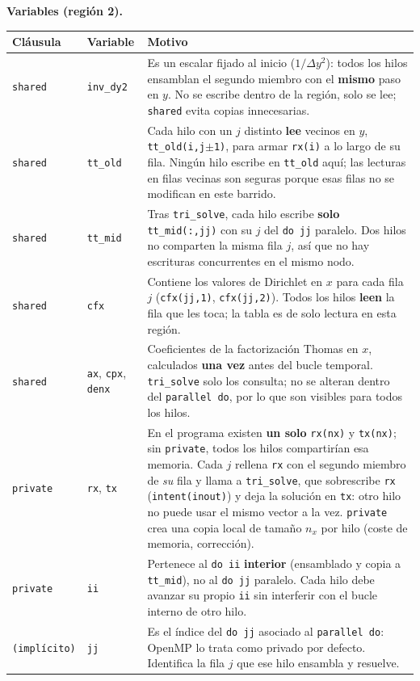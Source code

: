 \documentclass[11pt,a4paper]{article}
\begin{document}
\noindent\textbf{Variables (regi\'on 2).}
\begin{center}
\footnotesize
\begin{tabular}{@{}llM{7.6cm}@{}}
\hline
Cl\'ausula & Variable & Motivo \\
\hline
\texttt{shared} & \texttt{inv\_dy2} &
Es un escalar fijado al inicio ($1/\Delta y^2$): todos los hilos ensamblan el
segundo miembro con el \textbf{mismo} paso en $y$. No se escribe dentro de la
regi\'on, solo se lee; \texttt{shared} evita copias innecesarias. \\
\texttt{shared} & \texttt{tt\_old} &
Cada hilo con un $j$ distinto \textbf{lee} vecinos en $y$,
\texttt{tt\_old(i,j$\pm$1)}, para armar \texttt{rx(i)} a lo largo de su fila.
Ning\'un hilo escribe en \texttt{tt\_old} aqu\'i; las lecturas en filas vecinas
son seguras porque esas filas no se modifican en este barrido. \\
\texttt{shared} & \texttt{tt\_mid} &
Tras \texttt{tri\_solve}, cada hilo escribe \textbf{solo} \texttt{tt\_mid(:,jj)}
con su $j$ del \texttt{do jj} paralelo. Dos hilos no comparten la misma fila $j$,
as\'i que no hay escrituras concurrentes en el mismo nodo. \\
\texttt{shared} & \texttt{cfx} &
Contiene los valores de Dirichlet en $x$ para cada fila $j$
(\texttt{cfx(jj,1)}, \texttt{cfx(jj,2)}). Todos los hilos \textbf{leen} la fila
que les toca; la tabla es de solo lectura en esta regi\'on. \\
\texttt{shared} & \texttt{ax}, \texttt{cpx}, \texttt{denx} &
Coeficientes de la factorizaci\'on Thomas en $x$, calculados \textbf{una vez} antes
del bucle temporal. \texttt{tri\_solve} solo los consulta; no se alteran dentro del
\texttt{parallel do}, por lo que son visibles para todos los hilos. \\
\texttt{private} & \texttt{rx}, \texttt{tx} &
En el programa existen \textbf{un solo} \texttt{rx(nx)} y \texttt{tx(nx)}; sin
\texttt{private}, todos los hilos compartir\'ian esa memoria. Cada $j$ rellena
\texttt{rx} con el segundo miembro de \emph{su} fila y llama a \texttt{tri\_solve},
que sobrescribe \texttt{rx} (\texttt{intent(inout)}) y deja la soluci\'on en
\texttt{tx}: otro hilo no puede usar el mismo vector a la vez. \texttt{private}
crea una copia local de tama\~no $n_x$ por hilo (coste de memoria, correcci\'on). \\
\texttt{private} & \texttt{ii} &
Pertenece al \texttt{do ii} \textbf{interior} (ensamblado y copia a
\texttt{tt\_mid}), no al \texttt{do jj} paralelo. Cada hilo debe avanzar su propio
\texttt{ii} sin interferir con el bucle interno de otro hilo. \\
\texttt{(impl\'icito)} & \texttt{jj} &
Es el \'indice del \texttt{do jj} asociado al \texttt{parallel do}: OpenMP lo trata
como privado por defecto. Identifica la fila $j$ que ese hilo ensambla y resuelve. \\
\hline
\end{tabular}
\end{center}
\end{document}
